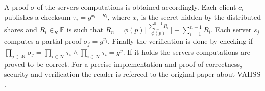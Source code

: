 A proof $\sigma$ of the servers computations is obtained accordingly.  Each client $c_i$ publishes a checksum $\tau_i= g^{x_i+R_i}$, where $x_i$ is the secret hidden by the distributed shares and $R_i\in_R\mathds{F}$ is such that $R_n=\phi(p) \lceil \frac{\sum_{i=1}^{n-1}R_i}{\phi(p)}\rceil - \sum_{i=1}^{n-1}R_i $. Each server $s_j$ computes a partial proof $\sigma_j = g^{y_j}$.  Finally the verification is done by checking if $\prod_{j\in\mathcal{M}} \sigma_j = \prod_{i\in\mathcal{N}}\tau_i\wedge \prod_{i\in\mathcal{N}}\tau_i = g^y$.  If it holds the servers computations are proved to be correct. For a precise implementation and proof of correctness, security and verification the reader is refereed to the original paper about VAHSS \cite{SumItUp}.
\begin{comment}





\end{comment}
